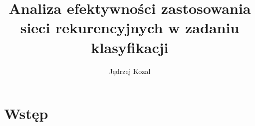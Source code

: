 \documentclass[oneside, mag]{mgr}
\title{Analiza efektywności zastosowania sieci rekurencyjnych w zadaniu klasyfikacji}
\author{Jędrzej Kozal}
\begin{document}
	
 
\maketitle
  
\chapter{Wstęp}
\end{document}
